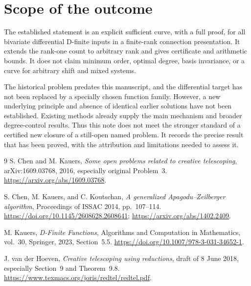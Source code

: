 \section{Scope of the outcome}
The established statement is an explicit sufficient curve, with a full
proof, for all bivariate differential D-finite inputs in a finite-rank
connection presentation. It extends the rank-one count to arbitrary
rank and gives certificate and arithmetic bounds. It does not claim
minimum order, optimal degree, basis invariance, or a curve for arbitrary
shift and mixed systems.

The historical problem predates this manuscript, and the differential
target has not been replaced by a specially chosen function family.
However, a new underlying principle and absence of identical earlier
solutions have not been established. Existing methods already supply
the main mechanism and broader degree-control results. Thus this note
does not meet the stronger standard of a certified new closure of a
still-open named problem. It records the precise result that has been
proved, with the attribution and limitations needed to assess it.

\begin{thebibliography}{9}
S. Chen and M. Kauers,
\emph{Some open problems related to creative telescoping},
arXiv:1609.03768, 2016, especially original Problem~3.
\url{https://arxiv.org/abs/1609.03768}.

S. Chen, M. Kauers, and C. Koutschan,
\emph{A generalized Apagodu--Zeilberger algorithm},
Proceedings of ISSAC 2014, pp.~107--114.
\url{https://doi.org/10.1145/2608628.2608641};
\url{https://arxiv.org/abs/1402.2409}.

M. Kauers, \emph{D-Finite Functions}, Algorithms and Computation in
Mathematics, vol.~30, Springer, 2023, Section~5.5.
\url{https://doi.org/10.1007/978-3-031-34652-1}.

J. van der Hoeven, \emph{Creative telescoping using reductions},
draft of 8 June 2018, especially Section~9 and Theorem~9.8.
\url{https://www.texmacs.org/joris/redtel/redtel.pdf}.
\end{thebibliography}


